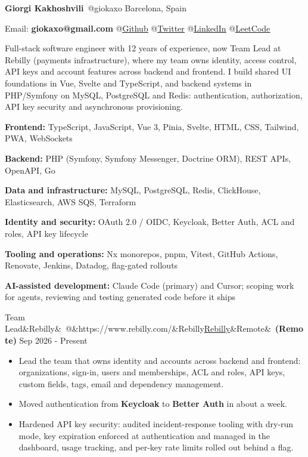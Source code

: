 \documentclass[10pt]{article}
\makeatletter
\newcommand{\weblink}[2]{\href{#1}{\textcolor{linkblue}{\underline{#2}}}}
\newcommand{\resumesection}[1]{\vspace{9pt}{\small\bfseries\textls{\MakeUppercase{#1}}}\par\vspace{3pt}}
\newcommand{\role}[5]{%
  \vspace{5pt}\par\noindent
  {\normalsize #1\ifx&#2&\else\ @\ifx&#3&#2\else\weblink{#3}{#2}\fi\fi\ifx&#4&\else\ \textbf{(#4)}\fi}%
  \hfill{\footnotesize #5}\par\nopagebreak\vspace{1pt}}
\makeatother
\begin{document}
\small

{\Large\bfseries Giorgi Kakhoshvili}\ {\large @giokaxo} \hfill Barcelona, Spain\par
\vspace{3pt}
Email: \textbf{giokaxo@gmail.com} \hfill {\footnotesize
@\weblink{https://github.com/giokaxo}{Github}
@\weblink{https://twitter.com/giokaxo}{Twitter}
@\weblink{https://www.linkedin.com/in/giorgi-kakhoshvili/}{LinkedIn}
@\weblink{https://leetcode.com/u/giokaxo/}{LeetCode}}\par

\resumesection{Summary}
Full-stack software engineer with 12 years of experience, now Team Lead at Rebilly (payments infrastructure), where my team owns identity, access control, API keys and account features across backend and frontend. I build shared UI foundations in Vue, Svelte and TypeScript, and backend systems in PHP/Symfony on MySQL, PostgreSQL and Redis: authentication, authorization, API key security and asynchronous provisioning.\par

\resumesection{Skills}
\textbf{Frontend:} TypeScript, JavaScript, Vue 3, Pinia, Svelte, HTML, CSS, Tailwind, PWA, WebSockets\par
\textbf{Backend:} PHP (Symfony, Symfony Messenger, Doctrine ORM), REST APIs, OpenAPI, Go\par
\textbf{Data and infrastructure:} MySQL, PostgreSQL, Redis, ClickHouse, Elasticsearch, AWS SQS, Terraform\par
\textbf{Identity and security:} OAuth 2.0 / OIDC, Keycloak, Better Auth, ACL and roles, API key lifecycle\par
\textbf{Tooling and operations:} Nx monorepos, pnpm, Vitest, GitHub Actions, Renovate, Jenkins, Datadog, flag-gated rollouts\par
\textbf{AI-assisted development:} Claude Code (primary) and Cursor; scoping work for agents, reviewing and testing generated code before it ships\par

\resumesection{Experience}

\role{Team Lead}{Rebilly}{https://www.rebilly.com/}{Remote}{Sep 2026 - Present}
\begin{itemize}
  \item Lead the team that owns identity and accounts across backend and frontend: organizations, sign-in, users and memberships, ACL and roles, API keys, custom fields, tags, email and dependency management.
  \item Moved authentication from \textbf{Keycloak} to \textbf{Better Auth} in about a week.
  \item Hardened API key security: audited incident-response tooling with dry-run mode, key expiration enforced at authentication and managed in the dashboard, usage tracking, and per-key rate limits rolled out behind a flag.
\end{itemize}
\end{document}
